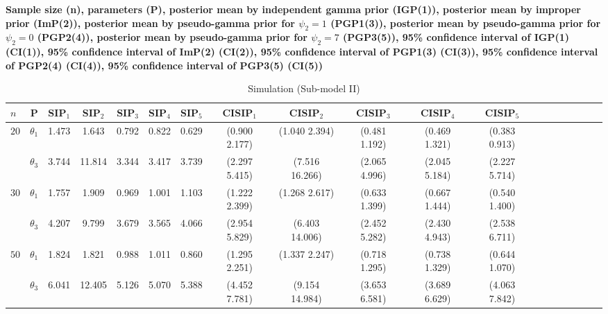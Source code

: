 \documentclass[12pt]{article}    %
\numberwithin{equation}{section}
\begin{document}
			\begin{landscape}
				\begin{table}
					\caption{{ Simulation (Sub-model II)}} 
					\label{Table_sub_II}
					\normalsize
					\begin{tablenotes}
						\item {\bf Sample size (n), parameters (P), posterior mean by independent gamma prior (IGP(1)), posterior mean by improper prior (ImP(2)), posterior mean by pseudo-gamma prior for $\psi_2=1$ (PGP1(3)), posterior mean by pseudo-gamma prior for $\psi_2=0$ (PGP2(4)), posterior mean by pseudo-gamma prior for $\psi_2=7$ (PGP3(5)),  95\% confidence interval of IGP(1) (CI(1)), 95\% confidence interval of ImP(2) (CI(2)), 95\% confidence interval of PGP1(3) (CI(3)), 95\% confidence interval of PGP2(4) (CI(4)), 95\% confidence interval of PGP3(5) (CI(5))}
					\end{tablenotes}
					\centering %
					\begin{tabular}{lcccccccccccccccccr} %
						\toprule[\heavyrulewidth]\toprule[\heavyrulewidth]
						\textbf{$n$ }  & \textbf{P} & \textbf{SIP$_1$} & \textbf{SIP$_2$} & \textbf{SIP$_3$} & \textbf{SIP$_4$} &\textbf{SIP$_5$} & \textbf{CISIP$_1$} &  \textbf{CISIP$_2$}   &  \textbf{CISIP$_3$}   &   \textbf{CISIP$_4$} & \textbf{CISIP$_5$}   \\ 
						\midrule
						
						\multirow{2}{*}{$20$} & $\theta_1$ & 1.473 & 1.643 & 0.792 & 0.822 &  0.629 & (0.900 2.177) & (1.040 2.394) & (0.481 1.192) & (0.469 1.321) & (0.383 0.913) \\
						& $\theta_3$ & 3.744 & 11.814 & 3.344 & 3.417 &  3.739 & (2.297 5.415) & (7.516 16.266) & (2.065 4.996) & (2.045 5.184) & (2.227 5.714)\\
						\bottomrule[\heavyrulewidth]    
						
						\multirow{2}{*}{$30$} & $\theta_1$ & 1.757 & 1.909 & 0.969 & 1.001 &  1.103 & (1.222 2.399) & (1.268 2.617) & (0.633 1.399) & (0.667 1.444) & (0.540  1.400) \\
						& $\theta_3$ & 4.207 & 9.799 & 3.679 & 3.565 &  4.066 & (2.954 5.829) & (6.403 14.006) & (2.452 5.282) & (2.430 4.943) & (2.538 6.711)\\
						\bottomrule[\heavyrulewidth]    
						
						\multirow{2}{*}{$50$} & $\theta_1$ & 1.824 & 1.821 & 0.988 & 1.011 &  0.860 & (1.295 2.251) & (1.337 2.247) & (0.718 1.295) & (0.738 1.329) & (0.644 1.070) \\
						& $\theta_3$ & 6.041 & 12.405 & 5.126 &  5.070 &  5.388 & (4.452 7.781) & (9.154 14.984) & (3.653 6.581) & (3.689 6.629) & (4.063 7.842)\\
						\bottomrule[\heavyrulewidth]    
						

\end{tabular}
\end{table}
\end{landscape}
\end{document}
